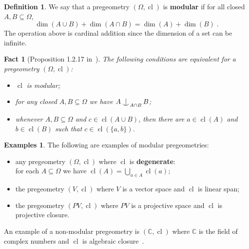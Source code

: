 \documentclass{article}
\newtheorem{fact}[theorem]{Fact}
\theoremstyle{remark}
\theoremstyle{definition}
\newtheorem{examples}[theorem]{Examples}
\newtheorem{definition}[theorem]{Definition}
\newcommand{\remmic}[1]{\textcolor{orange}{MP: #1}}
\newcommand{\repau}[1]{\textcolor{ForestGreen}{PM: #1}}
\DeclareMathOperator{\cl}{cl}
\def\Ind#1#2{#1\setbox0=\hbox{$#1x$}\kern\wd0\hbox to 0pt{\hss$#1\mid$\hss}
	\lower.9\ht0\hbox to 0pt{\hss$#1\smile$\hss}\kern\wd0}
\def\ind{\mathop{\mathpalette\Ind{}}}
\begin{document}
{{\begin{definition}
We say that a pregeometry $(\Omega, \cl)$ is \textbf{modular} if for all closed $A, B\subseteq \Omega$,
\[\dim(A\cup B)+\dim(A\cap B)=\dim(A)+\dim(B)\;.\]
The operation above is cardinal addition since the dimension of a set can be infinite.
\end{definition}

\begin{fact}[{{Proposition 1.2.17} in~\cite{d2023axiomatic}}]\label{fact:equivalentsmodular} The following conditions are equivalent {for a pregeometry $(\Omega,\cl)$}:%
\begin{itemize}
    \item $\cl$ is modular;
    \item for any closed $A, B\subseteq\Omega$ we have  $A\ind_{A\cap B} B$;
    \item whenever $A, B\subseteq\Omega$ and  $c\in\cl(A\cup B)$, then there are $a\in \cl(A)$ and $b\in \cl(B)$ such that $c\in\cl(\{a,b\})$.
\end{itemize}    
\end{fact}

\begin{examples} The following are examples of modular pregeometries:
\begin{itemize}
    \item any pregeometry {$(\Omega,\cl)$} where $\cl$ is \textbf{degenerate}:\\ for each $A\subseteq\Omega$ we have  $\cl(A)=\bigcup_{a\in A} \cl(a)$; 
    \item the pregeometry $(V, \cl)$ where $V$ is a vector space and $\cl$ is linear span;
    \item the pregeometry $(PV, \cl)$ where $PV$ is a projective space and $\cl$ is projective closure.
\end{itemize}
An example of a non-modular pregeometry is {$(\mathbb{C}, \cl)$ where $\mathbb{C}$ is the field of complex numbers and $\cl$ is algebraic closure~\cite[Example 1.8]{pillay1996geometric}.} %
\end{examples}

}}
\end{document}
